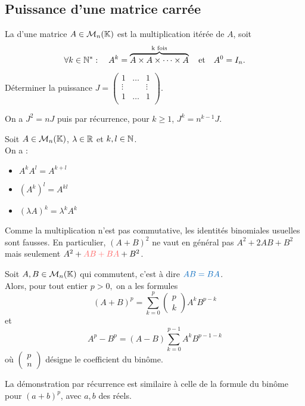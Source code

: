 \documentclass{book}
\begin{document}
\subsection{Puissance d'une matrice carrée}
\begin{Definition}[Puissance]
La  d'une matrice $A\in \mathcal{M}_{n}(\mathbb{K})$ est la multiplication itérée de  $A$, soit
$$\forall k \in \mathbb{N}^*:\quad  A^k = \overbrace{A\times A\times \dots\times A}^{\text{k fois}} \quad \text{et}\quad A^0=I_n.$$
\end{Definition}
\begin{Exemple}
Déterminer la puissance  $J =\begin{pmatrix}
1&\dots&1\\
\vdots& &\vdots\\
1 &\dots &1\\
\end{pmatrix}$.
\begin{Demonstration}
On a
$J^2 = nJ$ puis par récurrence, pour $k \geq 1$, $J^k = n^{k-1}J.$
\end{Demonstration}
\end{Exemple}
\begin{Proposition}[Propriétés]
Soit $A\in\mathcal{M}_{n}(\mathbb{K})$, $\lambda\in\mathbb{R}$ et $k,l\in\mathbb{N}$.\\
On a :
\begin{itemize}
\item $A^k A^l=A^{k+l}$
\item $\left(A^k\right)^l=A^{kl}$
\item $\left(\lambda A\right)^k=\lambda^k A^{k}$
\end{itemize}
\end{Proposition}

Comme la multiplication n'est pas commutative, les identités binomiales usuelles sont fausses. En particulier, $(A+ B)^2$ ne vaut en général pas $A^2 + 2AB + B^2$
 mais  seulement $A^2 +  \color{colordef}AB + BA\color{black}+ B^2$.
\begin{Proposition}
Soit $A,B\in\mathcal{M}_{n}(\mathbb{K})$  qui commutent, c'est à dire $\color{colorprop}AB = BA$.\\
Alors, pour tout entier $p > 0,$ on a les formules
$$(A+ B)^p=\sum_{k=0}^p\begin{pmatrix}
p\\k
\end{pmatrix} A^{k}B^{p-k}$$
et 
$$ A^p-B^p=(A-B)\sum_{k=0}^{p-1}A^k B^{p-1-k} $$
où $\begin{pmatrix}
p\\n
\end{pmatrix}$ désigne le coefficient du binôme.
\end{Proposition}
\begin{Demonstration}
La démonstration par récurrence est similaire à celle de la formule du binôme pour $(a + b)^p$, avec $a, b$ des réels. 
\end{Demonstration}
\end{document}
